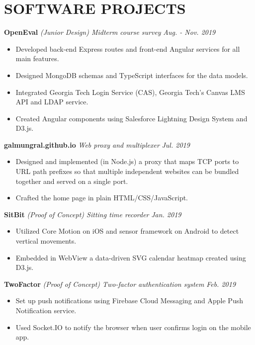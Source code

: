 \documentclass[12pt]{article}
\begin{document}
\section*{SOFTWARE PROJECTS}
\textbf{OpenEval} \enspace \textit{\color{gray} (Junior Design) Midterm course survey} \hfill \textit{\color{gray}Aug. - Nov. 2019}
\begin{itemize}[leftmargin=15pt, noitemsep, topsep=0pt]
\item Developed back-end Express routes and front-end Angular services for all main features.
\item Designed MongoDB schemas and TypeScript interfaces for the data models.
\item Integrated Georgia Tech Login Service (CAS), Georgia Tech's Canvas LMS API and LDAP service.
\item Created Angular components using Salesforce Lightning Design System and D3.js.
\end{itemize}
\vspace{0.5em}
%
\textbf{galmungral.github.io}  \enspace \textit{\color{gray} Web proxy and multiplexer} \hfill\textit{\color{gray} Jul. 2019}
\begin{itemize}[leftmargin=15pt, noitemsep, topsep=0pt]
\item Designed and implemented (in Node.js) a proxy that maps TCP ports to URL path prefixes so that multiple independent websites can be bundled together and served on a single port.
\item Crafted the home page in plain HTML/CSS/JavaScript.
\end{itemize}
\vspace{0.5em}
%
\textbf{SitBit} \enspace \textit{\color{gray}  (Proof of Concept) Sitting time recorder}  \hfill \textit{\color{gray} Jan. 2019}
\begin{itemize}[leftmargin=15pt, noitemsep, topsep=0pt]
\item Utilized Core Motion on iOS and sensor framework on Android to detect vertical movements.
\item Embedded in WebView a data-driven SVG calendar heatmap created using D3.js.
\end{itemize}
\vspace{0.5em}
%
\textbf{TwoFactor} \enspace \textit{\color{gray} (Proof of Concept) Two-factor authentication system} \hfill \textit{\color{gray} Feb. 2019}
\begin{itemize}[leftmargin=15pt, noitemsep, topsep=0pt]
\item Set up push notifications using Firebase Cloud Messaging and Apple Push Notification service.
\item Used Socket.IO to notify the browser when user confirms login on the mobile app.
\end{itemize}
\end{document}
